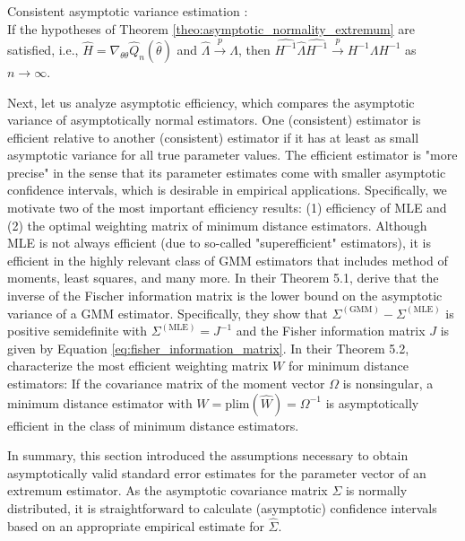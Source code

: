 \begin{theorem}
	Consistent asymptotic variance estimation \cite[Theorem 4.1]{NM94}: \\
	If the hypotheses of Theorem \ref{theo:asymptotic_normality_extremum} are satisfied, i.e., $\hat{H}=\nabla_{\theta \theta} \hat{Q}_n(\hat{\theta})$ and $\hat{\Lambda} \xrightarrow{p} \Lambda$, then $\hat{H^{-1}} \hat{\Lambda} \hat{H^{-1}}  \xrightarrow{p} H^{-1} \Lambda H^{-1}$ as $n \rightarrow \infty$.
\end{theorem}

Next, let us analyze asymptotic efficiency, which compares the asymptotic variance of asymptotically normal estimators.
One (consistent) estimator is efficient relative to another (consistent) estimator if it has at least as small asymptotic variance for all true parameter values.
The efficient estimator is "more precise" in the sense that its parameter estimates come with smaller asymptotic confidence intervals, which is desirable in empirical applications.
Specifically, we motivate two of the most important efficiency results:
(1) efficiency of MLE and (2) the optimal weighting matrix of minimum distance estimators.
Although MLE is not always efficient (due to so-called "superefficient" estimators), it is efficient in the highly relevant class of GMM estimators that includes method of moments, least squares, and many more.
In their Theorem 5.1, \cite{NM94} derive that the inverse of the Fischer information matrix is the lower bound on the asymptotic variance of a GMM estimator. 
Specifically, they show that $\Sigma^{(\mathrm{GMM})} - \Sigma^{(\mathrm{MLE})}$ is positive semidefinite with $\Sigma^{(\mathrm{MLE})}=J^{-1}$ and the Fisher information matrix $J$ is given by Equation \ref{eq:fisher_information_matrix}.
In their Theorem 5.2, \cite{NM94} characterize the most efficient weighting matrix $W$ for minimum distance estimators:
If the covariance matrix of the moment vector $\Omega$ is nonsingular, a minimum distance estimator with $W=\mathrm{plim}(\hat{W})=\Omega^{-1}$ is asymptotically efficient in the class of minimum distance estimators.

In summary, this section introduced the assumptions necessary to obtain asymptotically valid standard error estimates for the parameter vector of an extremum estimator.
As the asymptotic covariance matrix $\Sigma$ is normally distributed, it is straightforward to calculate (asymptotic) confidence intervals based on an appropriate empirical estimate for $\hat{\Sigma}$.
